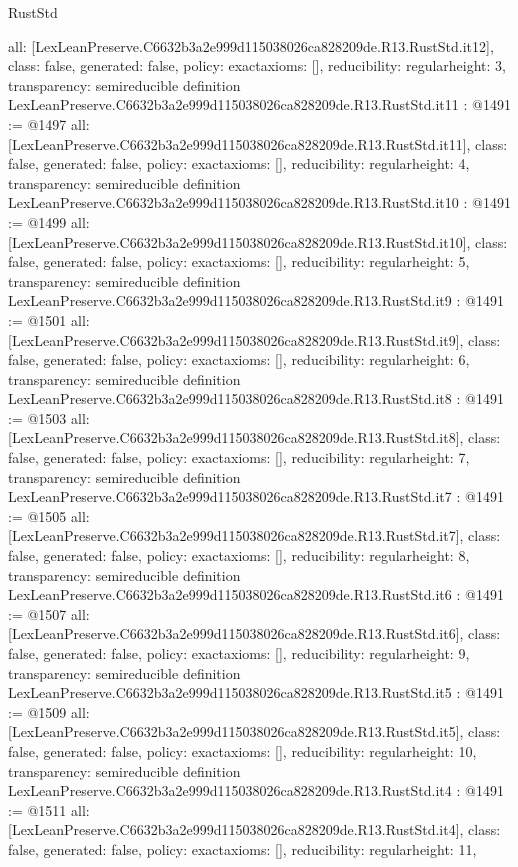 \begin{lexlean}{RustStd}
\begin{coremodule}
{  all: [LexLeanPreserve.C6632b3a2e999d115038026ca828209de.R13.RustStd.it12],
  class: false,
  generated: false,
  policy: exact{axioms: []},
  reducibility: regular{height: 3},
  transparency: semireducible
}
definition LexLeanPreserve.C6632b3a2e999d115038026ca828209de.R13.RustStd.it11 : @1491 := @1497 {
  all: [LexLeanPreserve.C6632b3a2e999d115038026ca828209de.R13.RustStd.it11],
  class: false,
  generated: false,
  policy: exact{axioms: []},
  reducibility: regular{height: 4},
  transparency: semireducible
}
definition LexLeanPreserve.C6632b3a2e999d115038026ca828209de.R13.RustStd.it10 : @1491 := @1499 {
  all: [LexLeanPreserve.C6632b3a2e999d115038026ca828209de.R13.RustStd.it10],
  class: false,
  generated: false,
  policy: exact{axioms: []},
  reducibility: regular{height: 5},
  transparency: semireducible
}
definition LexLeanPreserve.C6632b3a2e999d115038026ca828209de.R13.RustStd.it9 : @1491 := @1501 {
  all: [LexLeanPreserve.C6632b3a2e999d115038026ca828209de.R13.RustStd.it9],
  class: false,
  generated: false,
  policy: exact{axioms: []},
  reducibility: regular{height: 6},
  transparency: semireducible
}
definition LexLeanPreserve.C6632b3a2e999d115038026ca828209de.R13.RustStd.it8 : @1491 := @1503 {
  all: [LexLeanPreserve.C6632b3a2e999d115038026ca828209de.R13.RustStd.it8],
  class: false,
  generated: false,
  policy: exact{axioms: []},
  reducibility: regular{height: 7},
  transparency: semireducible
}
definition LexLeanPreserve.C6632b3a2e999d115038026ca828209de.R13.RustStd.it7 : @1491 := @1505 {
  all: [LexLeanPreserve.C6632b3a2e999d115038026ca828209de.R13.RustStd.it7],
  class: false,
  generated: false,
  policy: exact{axioms: []},
  reducibility: regular{height: 8},
  transparency: semireducible
}
definition LexLeanPreserve.C6632b3a2e999d115038026ca828209de.R13.RustStd.it6 : @1491 := @1507 {
  all: [LexLeanPreserve.C6632b3a2e999d115038026ca828209de.R13.RustStd.it6],
  class: false,
  generated: false,
  policy: exact{axioms: []},
  reducibility: regular{height: 9},
  transparency: semireducible
}
definition LexLeanPreserve.C6632b3a2e999d115038026ca828209de.R13.RustStd.it5 : @1491 := @1509 {
  all: [LexLeanPreserve.C6632b3a2e999d115038026ca828209de.R13.RustStd.it5],
  class: false,
  generated: false,
  policy: exact{axioms: []},
  reducibility: regular{height: 10},
  transparency: semireducible
}
definition LexLeanPreserve.C6632b3a2e999d115038026ca828209de.R13.RustStd.it4 : @1491 := @1511 {
  all: [LexLeanPreserve.C6632b3a2e999d115038026ca828209de.R13.RustStd.it4],
  class: false,
  generated: false,
  policy: exact{axioms: []},
  reducibility: regular{height: 11},
}
\end{coremodule}
\end{lexlean}
